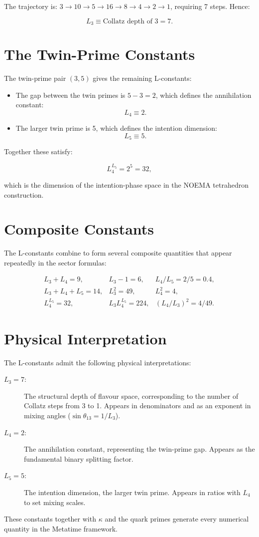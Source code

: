The trajectory is: \(3 \to 10 \to 5 \to 16 \to 8 \to 4 \to 2 \to 1\),
requiring 7 steps.  Hence:

\begin{equation}
L_3 \equiv \text{Collatz depth of 3} = 7.
\label{eq:L3}
\end{equation}

\section{The Twin-Prime Constants}

The twin-prime pair \((3,5)\) gives the remaining L-constants:

\begin{itemize}
\item The gap between the twin primes is \(5 - 3 = 2\), which defines the
annihilation constant:
\[
L_4 \equiv 2.
\]

\item The larger twin prime is 5, which defines the intention dimension:
\[
L_5 \equiv 5.
\]
\end{itemize}

Together these satisfy:

\[
L_4^{L_5} = 2^5 = 32,
\]

which is the dimension of the intention-phase space in the NOEMA tetrahedron
construction.

\section{Composite Constants}

The L-constants combine to form several composite quantities that appear
repeatedly in the sector formulas:

\[
\begin{array}{lcl}
L_3 + L_4 = 9, & L_3 - 1 = 6, & L_4/L_5 = 2/5 = 0.4, \\
L_3 + L_4 + L_5 = 14, & L_3^2 = 49, & L_4^2 = 4, \\
L_4^{L_5} = 32, & L_3 L_4^{L_5} = 224, & (L_4/L_3)^2 = 4/49.
\end{array}
\]

\section{Physical Interpretation}

The L-constants admit the following physical interpretations:

\begin{description}
\item[\(L_3 = 7\):] The structural depth of flavour space, corresponding to
the number of Collatz steps from 3 to 1.  Appears in denominators and as an
exponent in mixing angles (\(\sin\theta_{13} = 1/L_3\)).

\item[\(L_4 = 2\):] The annihilation constant, representing the twin-prime
gap.  Appears as the fundamental binary splitting factor.

\item[\(L_5 = 5\):] The intention dimension, the larger twin prime.
Appears in ratios with \(L_4\) to set mixing scales.
\end{description}

These constants together with \(\kappa\) and the quark primes generate every
numerical quantity in the Metatime framework.
